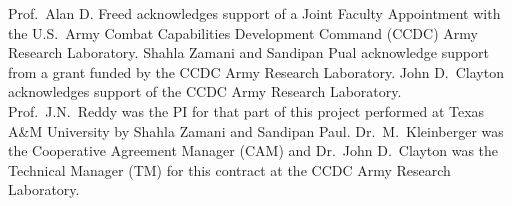 \documentclass{arlticle}
\begin{document}

\arltitlepage%

\begin{createSFtwoNINEeight}
    \SFitemFIVEd{}
    \SFitemFIFTEEN{%
    }
    \SFitemEIGHTEEN{\ref{TotPages}}%
    \SFitemNINETEENa{%
    }
    \SFitemNINETEENb{%
    }
\end{createSFtwoNINEeight}
%

\tableofcontents%
\listoffigures%
\pagebreak
\listoftables*%
\acknowledgments
Prof.\ Alan D. Freed acknowledges support of a Joint Faculty Appointment with the U.S.\ Army Combat Capabilities Development Command (CCDC) Army Research Laboratory.  Shahla Zamani and Sandipan Pual acknowledge support from a grant funded by the CCDC Army Research Laboratory.  John D.\ Clayton acknowledges support of the CCDC Army Research Laboratory.  Prof.\ J.N.\ Reddy was the PI for that part of this project performed at Texas A\&M University by Shahla Zamani and Sandipan Paul.  Dr.\ M.\ Kleinberger was the Cooperative Agreement Manager (CAM) and Dr.\ John D.\ Clayton was the Technical Manager (TM) for this contract at the CCDC Army Research Laboratory.
\end{document}
